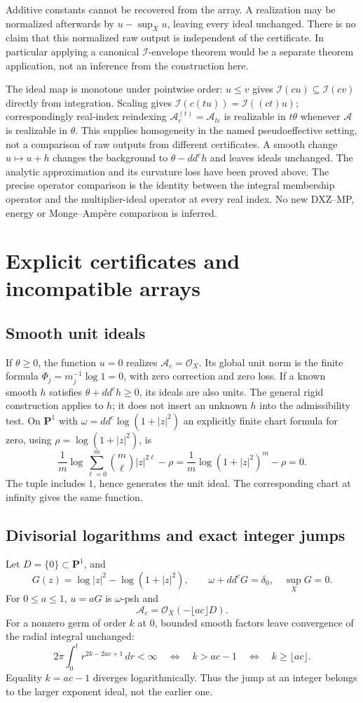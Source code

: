\documentclass[11pt]{article}
\newcommand{\I}{\mathcal I}
\newcommand{\A}{\mathcal A}
\newcommand{\OO}{\mathcal O}
\theoremstyle{definition}
\begin{document}
Additive constants cannot be recovered from the array. A realization
may be normalized afterwards by $u-\sup_Xu$, leaving every ideal
unchanged. There is no claim that this normalized raw output is
independent of the certificate. In particular applying a canonical
$\I$-envelope theorem would be a separate theorem application,
not an inference from the construction here.

The ideal map is monotone under pointwise order: $u\leq v$ gives
$\I(cu)\subseteq\I(cv)$ directly from integration. Scaling gives
$\I(c(tu))=\I((ct)u)$; correspondingly real-index reindexing
$\A^{(t)}_c=\A_{tc}$ is realizable in $t\theta$ whenever $\A$
is realizable in $\theta$. This supplies homogeneity in the named
pseudoeffective setting, not a comparison of raw outputs from
different certificates. A smooth change $u\mapsto u+h$ changes
the background to $\theta-dd^ch$ and leaves ideals unchanged.
The analytic approximation and its curvature loss have been proved
above. The precise operator comparison is the identity between
the integral membership operator and the multiplier-ideal operator
at every real index. No new DXZ--MP, energy or Monge--Amp\`ere
comparison is inferred.

\section{Explicit certificates and incompatible arrays}\label{sec:examples}
\subsection{Smooth unit ideals}
If $\theta\geq0$, the function $u=0$ realizes $\A_c=\OO_X$.
Its global unit norm is the finite formula $\Phi_j=m_j^{-1}\log1=0$,
with zero correction and zero loss. If a known smooth $h$ satisfies
$\theta+dd^ch\geq0$, its ideals are also units. The general rigid
construction applies to $h$; it does not insert an unknown $h$
into the admissibility test.
On $\mathbf P^1$ with
$\omega=dd^c\log(1+|z|^2)$ an explicitly finite chart formula for
zero, using $\rho=\log(1+|z|^2)$, is
\[
 \frac1m\log\sum_{\ell=0}^m
   \binom m\ell |z|^{2\ell}-\rho
 =\frac1m\log(1+|z|^2)^m-\rho=0.
\]
The tuple includes $1$, hence generates the unit ideal. The
corresponding chart at infinity gives the same function.

\subsection{Divisorial logarithms and exact integer jumps}
Let $D=\{0\}\subset\mathbf P^1$, and
\[
 G(z)=\log|z|^2-\log(1+|z|^2),\qquad
 \omega+dd^cG=\delta_0,\quad\sup_XG=0.
\]
For $0\leq a\leq1$, $u=aG$ is $\omega$-psh and
\begin{equation}\label{eq:divarray}
 \A_c=\OO_X(-\lfloor ac\rfloor D).
\end{equation}
For a nonzero germ of order $k$ at $0$, bounded smooth factors
leave convergence of the radial integral unchanged:
\[
 2\pi\int_0^t r^{2k-2ac+1}\,dr<\infty
 \quad\Longleftrightarrow\quad k>ac-1
 \quad\Longleftrightarrow\quad k\geq\lfloor ac\rfloor.
\]
Equality $k=ac-1$ diverges logarithmically. Thus the jump at an
integer belongs to the larger exponent ideal, not the earlier one.
\end{document}
